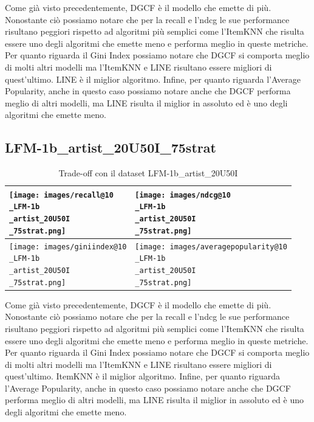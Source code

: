 \noindent Come già visto precedentemente, DGCF è il modello che emette di più. Nonostante ciò possiamo notare che per la recall e l'ndcg le sue performance risultano peggiori rispetto ad algoritmi più semplici come l'ItemKNN che risulta essere uno degli algoritmi che emette meno e performa meglio in queste metriche.
Per quanto riguarda il Gini Index possiamo notare che DGCF si comporta meglio di molti altri modelli ma l'ItemKNN e LINE risultano essere migliori di quest'ultimo. LINE è il miglior algoritmo.
Infine, per quanto riguarda l'Average Popularity, anche in questo caso possiamo notare anche che DGCF performa meglio di altri modelli, ma LINE risulta il miglior in assoluto ed è uno degli algoritmi che emette meno.


\subsection{LFM-1b\_artist\_20U50I\_75strat}


\begin{table}[H]
    \centering
    \footnotesize
    \setlength\tabcolsep{0pt}
    \begin{tabularx}{\textwidth}{|X|X|}
        \hline
        \texttt{[image: images/recall@10\\\_LFM-1b\\\_artist\_20U50I\\\_75strat.png]} &
        \texttt{[image: images/ndcg@10\\\_LFM-1b\\\_artist\_20U50I\\\_75strat.png]} \\
        \hline
        \texttt{[image: images/giniindex@10\\\_LFM-1b\\\_artist\_20U50I\\\_75strat.png]} &
        \texttt{[image: images/averagepopularity@10\\\_LFM-1b\\\_artist\_20U50I\\\_75strat.png]} \\
        \hline
    \end{tabularx}
    \caption{Trade-off con il dataset LFM-1b\_artist\_20U50I}
    \label{tab:emissions_info}
\end{table}


\noindent Come già visto precedentemente, DGCF è il modello che emette di più. Nonostante ciò possiamo notare che per la recall e l'ndcg le sue performance risultano peggiori rispetto ad algoritmi più semplici come l'ItemKNN che risulta essere uno degli algoritmi che emette meno e performa meglio in queste metriche.
Per quanto riguarda il Gini Index possiamo notare che DGCF si comporta meglio di molti altri modelli ma l'ItemKNN e LINE risultano essere migliori di quest'ultimo. ItemKNN è il miglior algoritmo.
Infine, per quanto riguarda l'Average Popularity, anche in questo caso possiamo notare anche che DGCF performa meglio di altri modelli, ma LINE risulta il miglior in assoluto ed è uno degli algoritmi che emette meno.





